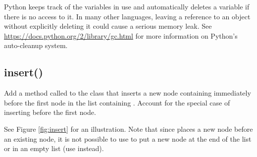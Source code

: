 \begin{warn} %
Python keeps track of the variables in use and automatically deletes a variable if there is no access to it.
In many other languages, leaving a reference to an object without explicitly deleting it could cause a serious memory leak.
See \url{https://docs.python.org/2/library/gc.html} for more information on Python's auto-cleanup system.
\end{warn}

\subsection*{insert()} %

\begin{problem} %
Add a method called  to the  class that inserts a new node containing  immediately before the first node in the list containing .
Account for the special case of inserting before the first node.

See Figure \ref{fig:insert} for an illustration.
Note that since  places a new node before an existing node, it is not possible to use  to put a new node at the end of the list or in an empty list (use  instead).
\end{problem}

